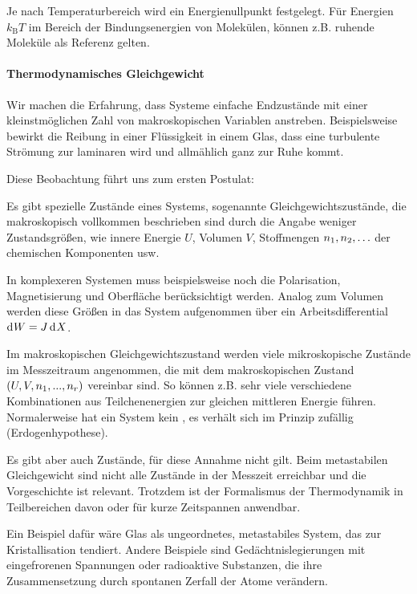 Je nach Temperaturbereich wird ein Energienullpunkt festgelegt.
Für Energien $k_\mathrm{B}T$ im Bereich der Bindungsenergien von Molekülen, können z.B. ruhende Moleküle als Referenz gelten.


\paragraph*{Thermodynamisches Gleichgewicht}

Wir machen die Erfahrung, dass Systeme einfache Endzustände mit einer kleinstmöglichen Zahl von makroskopischen Variablen anstreben. Beispielsweise bewirkt die Reibung in einer Flüssigkeit in einem Glas, dass eine turbulente Strömung zur laminaren wird und allmählich ganz zur Ruhe kommt.

Diese Beobachtung führt uns zum ersten Postulat:
\begin{postulate}
    \label{post:gleichgewichtszustaende}
    Es gibt spezielle Zustände eines Systems, sogenannte Gleichgewichtszustände, die makroskopisch vollkommen beschrieben sind durch die Angabe weniger Zustandsgrößen, wie innere Energie $U$, Volumen $V$, Stoffmengen $n_1,n_2,\ldots$ der chemischen Komponenten usw.
\end{postulate}

In komplexeren Systemen muss beispielsweise noch die Polarisation, Magnetisierung und Oberfläche berücksichtigt werden. Analog zum Volumen werden diese Größen in das System aufgenommen über ein Arbeitsdifferential $\mathop{\mathrm{d}^{}W} = J\mathop{\mathrm{d}^{}X}$.

Im makroskopischen Gleichgewichtszustand werden viele mikroskopische Zustände im Messzeitraum angenommen, die mit dem makroskopischen Zustand $(U,V,n_1,...,n_r)$ vereinbar sind. So können z.B. sehr viele verschiedene Kombinationen aus Teilchenenergien zur gleichen mittleren Energie führen. Normalerweise hat ein System kein , es verhält sich im Prinzip zufällig (Erdogenhypothese).

Es gibt aber auch Zustände, für diese Annahme nicht gilt. Beim metastabilen Gleichgewicht sind nicht alle Zustände in der Messzeit erreichbar und die Vorgeschichte ist relevant. Trotzdem ist der Formalismus der Thermodynamik in Teilbereichen davon oder für kurze Zeitspannen anwendbar.


Ein Beispiel dafür %
wäre Glas als ungeordnetes, metastabiles System, das zur Kristallisation tendiert. Andere Beispiele sind Gedächtnislegierungen mit eingefrorenen Spannungen oder radioaktive Substanzen, die ihre Zusammensetzung durch spontanen Zerfall der Atome verändern.


